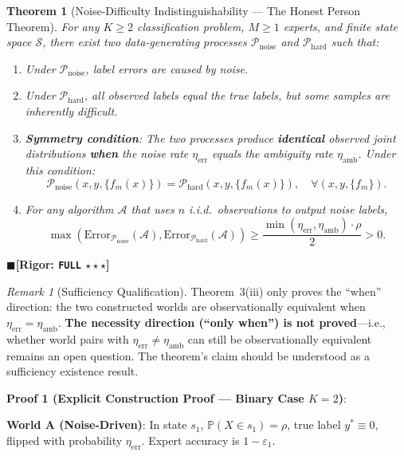 \documentclass[12pt,a4paper]{article}
\newtheorem{theorem}{Theorem}[section]
\theoremstyle{definition}
\theoremstyle{remark}
\newtheorem{remark}{Remark}[section]
\newcommand{\rigorFull}{$\blacksquare$\;\textbf{[Rigor: \texttt{FULL} $\star\star\star$]}}
\begin{document}
\begin{theorem}[Noise-Difficulty Indistinguishability --- The Honest Person Theorem]
\label{thm:3}
For any $K \geq 2$ classification problem, $M \geq 1$ experts, and finite state space $\mathcal{S}$, there exist two data-generating processes $\mathcal{P}_{\text{noise}}$ and $\mathcal{P}_{\text{hard}}$ such that:
\begin{enumerate}[label=(\roman*)]
\item Under $\mathcal{P}_{\text{noise}}$, label errors are caused by noise.
\item Under $\mathcal{P}_{\text{hard}}$, all observed labels equal the true labels, but some samples are inherently difficult.
\item \textbf{Symmetry condition}: The two processes produce \textbf{identical} observed joint distributions \textbf{when} the noise rate $\eta_{\text{err}}$ equals the ambiguity rate $\eta_{\text{amb}}$. Under this condition:
\begin{equation}
\mathcal{P}_{\text{noise}}(x, y, \{f_m(x)\}) = \mathcal{P}_{\text{hard}}(x, y, \{f_m(x)\}), \quad \forall (x, y, \{f_m\}).
\end{equation}
\item For any algorithm $\mathcal{A}$ that uses $n$ i.i.d.\ observations to output noise labels,
\begin{equation}
\max(\mathrm{Error}_{\mathcal{P}_{\text{noise}}}(\mathcal{A}), \mathrm{Error}_{\mathcal{P}_{\text{hard}}}(\mathcal{A})) \geq \frac{\min(\eta_{\text{err}}, \eta_{\text{amb}}) \cdot \rho}{2} > 0.
\end{equation}
\end{enumerate}
\end{theorem}
\rigorFull

\begin{remark}[Sufficiency Qualification]
Theorem~3(iii) only proves the ``when'' direction: the two constructed worlds are observationally equivalent when $\eta_{\text{err}}=\eta_{\text{amb}}$. \textbf{The necessity direction (``only when'') is not proved}---i.e., whether world pairs with $\eta_{\text{err}}\neq\eta_{\text{amb}}$ can still be observationally equivalent remains an open question. The theorem's claim should be understood as a sufficiency existence result.
\end{remark}

\textbf{Proof 1 (Explicit Construction Proof --- Binary Case $K=2$)}:

\textbf{World A (Noise-Driven)}: In state $s_1$, $\mathbb{P}(X\in s_1)=\rho$, true label $y^*\equiv0$, flipped with probability $\eta_{\text{err}}$. Expert accuracy is $1-\varepsilon_1$.
\end{document}
